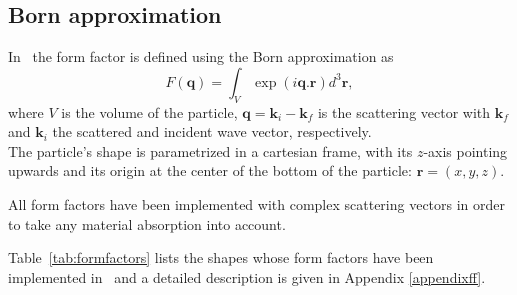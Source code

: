\subsection{Born approximation}

In \BornAgain\ the form factor is defined using the Born approximation as
\begin{equation}
F(\mathbf{q})=\int_V \exp (i\mathbf{q}.\mathbf{r}) d^3 \mathbf{r},
\label{ffformulaBA}
\end{equation}
where $V$ is the volume of the particle,
$\mathbf{q}=\mathbf{k}_i - \mathbf{k}_f$ is the scattering vector with
$\mathbf{k}_f$ and $\mathbf{k}_i$ the scattered and incident wave
vector, respectively.\\

The particle's shape is parametrized in a cartesian frame, with its
$z$-axis pointing upwards and its origin at the center of the bottom
of the particle: $\mathbf{r}=(x,y,z)$. 

All form factors have been implemented with complex scattering vectors
in order to take any material absorption into account.

Table~\ref{tab:formfactors} lists the shapes whose form
factors have been implemented in \BornAgain\ and a detailed description is given in Appendix \ref{appendixff}.

\newpage

